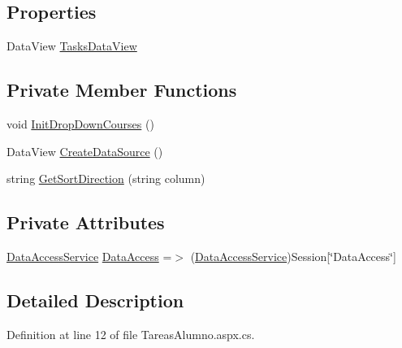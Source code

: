 \subsection*{Properties}
\begin{DoxyCompactItemize}
\item 
Data\+View \mbox{\hyperlink{classWebApplication_1_1UserPage_1_1TareasAlumno_a1ee89d7ad26a4fb02b51f9c9b653b871}{Tasks\+Data\+View}}
\end{DoxyCompactItemize}
\subsection*{Private Member Functions}
\begin{DoxyCompactItemize}
\item 
void \mbox{\hyperlink{classWebApplication_1_1UserPage_1_1TareasAlumno_ab0cfef17218faaef8b7a36d84b04ab7f}{Init\+Drop\+Down\+Courses}} ()
\item 
Data\+View \mbox{\hyperlink{classWebApplication_1_1UserPage_1_1TareasAlumno_ab0a4a1c6a035c71f1df8b2557e518ced}{Create\+Data\+Source}} ()
\item 
string \mbox{\hyperlink{classWebApplication_1_1UserPage_1_1TareasAlumno_a7907c4d40a61f3a8c7390f7e1ad27219}{Get\+Sort\+Direction}} (string column)
\end{DoxyCompactItemize}
\subsection*{Private Attributes}
\begin{DoxyCompactItemize}
\item 
\mbox{\hyperlink{classDataBaseAccess_1_1DataAccessService}{Data\+Access\+Service}} \mbox{\hyperlink{classWebApplication_1_1UserPage_1_1TareasAlumno_a63b4d6c345c2df409f3119583bf39039}{Data\+Access}} =$>$ (\mbox{\hyperlink{classDataBaseAccess_1_1DataAccessService}{Data\+Access\+Service}})Session\mbox{[}\char`\"{}Data\+Access\char`\"{}\mbox{]}
\end{DoxyCompactItemize}


\subsection{Detailed Description}


Definition at line 12 of file Tareas\+Alumno.\+aspx.\+cs.



